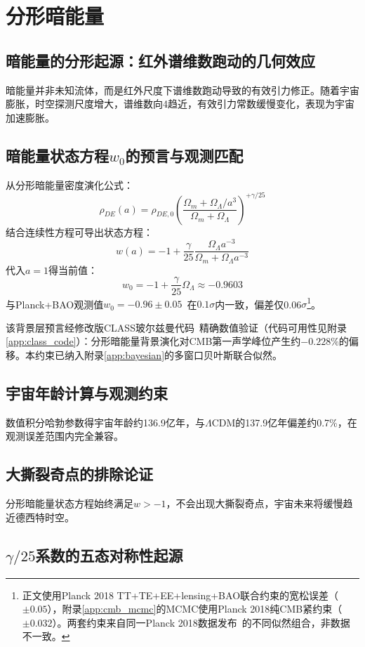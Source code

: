 \documentclass[12pt,a4paper,twocolumn]{article}
\begin{document}
\section{分形暗能量}
\label{sec:dark_energy}

\subsection{暗能量的分形起源：红外谱维数跑动的几何效应}
暗能量并非未知流体，而是红外尺度下谱维数跑动导致的有效引力修正。随着宇宙膨胀，时空探测尺度增大，谱维数向4趋近，有效引力常数缓慢变化，表现为宇宙加速膨胀。

\subsection{暗能量状态方程$w_0$的预言与观测匹配}
从分形暗能量密度演化公式：
\[
\rho_{DE}(a) = \rho_{DE,0} \left( \frac{\Omega_m + \Omega_\Lambda/a^3}{\Omega_m + \Omega_\Lambda} \right)^{+\gamma/25}
\]
结合连续性方程可导出状态方程：
\[
w(a) = -1 + \frac{\gamma}{25} \frac{\Omega_\Lambda a^{-3}}{\Omega_m + \Omega_\Lambda a^{-3}}
\]
代入$a=1$得当前值：
\[
w_0 = -1 + \frac{\gamma}{25} \Omega_\Lambda \approx -0.9603
\]
与Planck+BAO观测值$w_0 = -0.96 \pm 0.05$~\cite{Planck2020}在$0.1\sigma$内一致，偏差仅0.06$\sigma$\footnote{正文使用Planck 2018 TT+TE+EE+lensing+BAO联合约束的宽松误差（$\pm0.05$），附录\ref{app:cmb_mcmc}的MCMC使用Planck 2018纯CMB紧约束（$\pm0.032$）。两套约束来自同一Planck 2018数据发布~\cite{Planck2020}的不同似然组合，非数据不一致。}。

该背景层预言经修改版CLASS玻尔兹曼代码~\cite{class_code}精确数值验证（代码可用性见附录\ref{app:class_code}）：分形暗能量背景演化对CMB第一声学峰位产生约$\mathbf{-0.228\%}$的偏移。本约束已纳入附录\ref{app:bayesian}的多窗口贝叶斯联合似然。

\subsection{宇宙年龄计算与观测约束}
数值积分哈勃参数得宇宙年龄约136.9亿年，与$\Lambda$CDM的137.9亿年偏差约0.7\%，在观测误差范围内完全兼容。

\subsection{大撕裂奇点的排除论证}
分形暗能量状态方程始终满足$w > -1$，不会出现大撕裂奇点，宇宙未来将缓慢趋近德西特时空。

\subsection{$\gamma/25$系数的五态对称性起源}
\label{subsec:gamma_25_origin}
\end{document}
